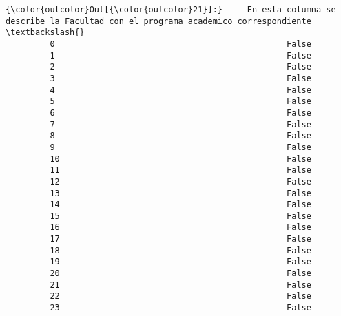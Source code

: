 \documentclass[11pt]{article}
\begin{document}
\begin{Verbatim}[commandchars=\\\{\}]
{\color{outcolor}Out[{\color{outcolor}21}]:}     En esta columna se describe la Facultad con el programa academico correspondiente   \textbackslash{}
         0                                               False                                    
         1                                               False                                    
         2                                               False                                    
         3                                               False                                    
         4                                               False                                    
         5                                               False                                    
         6                                               False                                    
         7                                               False                                    
         8                                               False                                    
         9                                               False                                    
         10                                              False                                    
         11                                              False                                    
         12                                              False                                    
         13                                              False                                    
         14                                              False                                    
         15                                              False                                    
         16                                              False                                    
         17                                              False                                    
         18                                              False                                    
         19                                              False                                    
         20                                              False                                    
         21                                              False                                    
         22                                              False                                    
         23                                              False                                    

\end{Verbatim}
\end{document}
